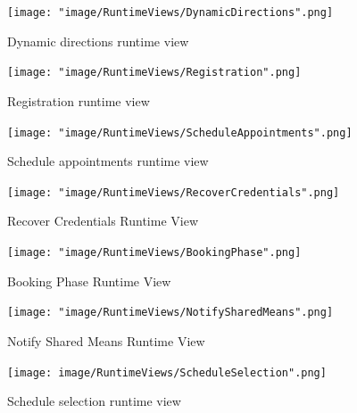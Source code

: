 \begin{figure}[H]
\begin{center}
\texttt{[image: "image/RuntimeViews/DynamicDirections".png]}
\caption{Dynamic directions runtime view}
\end{center}
\end{figure}

\begin{figure}[H]
\begin{center}
\texttt{[image: "image/RuntimeViews/Registration".png]}
\caption{Registration runtime view}
\end{center}
\end{figure}

\begin{figure}[H]
\begin{center}
\texttt{[image: "image/RuntimeViews/ScheduleAppointments".png]}
\caption{Schedule appointments runtime view}
\end{center}
\end{figure}

\begin{figure}[H]
\begin{center}

\texttt{[image: "image/RuntimeViews/RecoverCredentials".png]}
\caption{Recover Credentials Runtime View}
\end{center}
\end{figure}

\begin{figure}[H]
\begin{center}
\texttt{[image: "image/RuntimeViews/BookingPhase".png]}
\caption{Booking Phase Runtime View}
\end{center}
\end{figure}

\begin{figure}[H]
\begin{center}
\texttt{[image: "image/RuntimeViews/NotifySharedMeans".png]}
\caption{Notify Shared Means Runtime View}
\end{center}
\end{figure}


\begin{figure}[H]
\begin{center}
\texttt{[image: image/RuntimeViews/ScheduleSelection".png]}
\caption{Schedule selection runtime view}
\end{center}
\end{figure}

